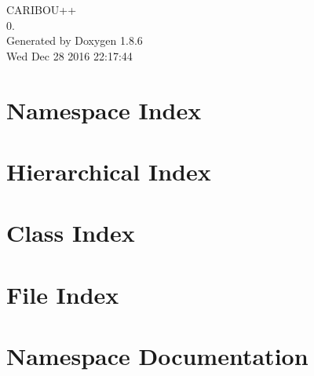 \documentclass[twoside]{book}
\newcommand{\clearemptydoublepage}{%
  \newpage{\pagestyle{empty}\cleardoublepage}%
}
\begin{document}
\begin{titlepage}
\vspace*{7cm}
\begin{center}%
{\Large C\-A\-R\-I\-B\-O\-U++ \\[1ex]\large 0. }\\
\vspace*{1cm}
{\large Generated by Doxygen 1.8.6}\\
\vspace*{0.5cm}
{\small Wed Dec 28 2016 22:17:44}\\
\end{center}
\end{titlepage}
\clearemptydoublepage
\tableofcontents
\clearemptydoublepage
{}

\chapter{Namespace Index}

\chapter{Hierarchical Index}

\chapter{Class Index}

\chapter{File Index}

\chapter{Namespace Documentation}

\end{document}

